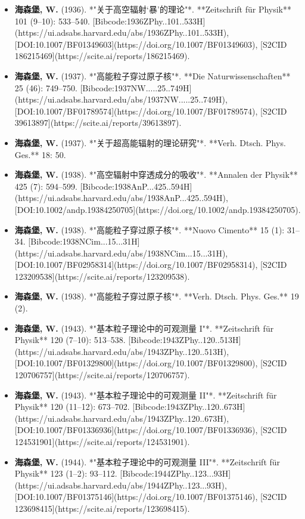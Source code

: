 \begin{itemize}
\item \textbf{海森堡, W.} (1936). *"关于高空辐射‘暴’的理论"*. **Zeitschrift für Physik** 101 (9–10): 533–540. [Bibcode:1936ZPhy..101..533H](https://ui.adsabs.harvard.edu/abs/1936ZPhy..101..533H), [DOI:10.1007/BF01349603](https://doi.org/10.1007/BF01349603), [S2CID 186215469](https://scite.ai/reports/186215469).  
\item \textbf{海森堡, W.} (1937). *"高能粒子穿过原子核"*. **Die Naturwissenschaften** 25 (46): 749–750. [Bibcode:1937NW.....25..749H](https://ui.adsabs.harvard.edu/abs/1937NW.....25..749H), [DOI:10.1007/BF01789574](https://doi.org/10.1007/BF01789574), [S2CID 39613897](https://scite.ai/reports/39613897).  
\item \textbf{海森堡, W.} (1937). *"关于超高能辐射的理论研究"*. **Verh. Dtsch. Phys. Ges.** 18: 50.  
\item \textbf{海森堡, W.} (1938). *"高空辐射中穿透成分的吸收"*. **Annalen der Physik** 425 (7): 594–599. [Bibcode:1938AnP...425..594H](https://ui.adsabs.harvard.edu/abs/1938AnP...425..594H), [DOI:10.1002/andp.19384250705](https://doi.org/10.1002/andp.19384250705).  
\item \textbf{海森堡, W.} (1938). *"高能粒子穿过原子核"*. **Nuovo Cimento** 15 (1): 31–34. [Bibcode:1938NCim...15...31H](https://ui.adsabs.harvard.edu/abs/1938NCim...15...31H), [DOI:10.1007/BF02958314](https://doi.org/10.1007/BF02958314), [S2CID 123209538](https://scite.ai/reports/123209538).  
\item \textbf{海森堡, W.} (1938). *"高能粒子穿过原子核"*. **Verh. Dtsch. Phys. Ges.** 19 (2).  
\item \textbf{海森堡, W.} (1943). *"基本粒子理论中的可观测量 I"*. **Zeitschrift für Physik** 120 (7–10): 513–538. [Bibcode:1943ZPhy..120..513H](https://ui.adsabs.harvard.edu/abs/1943ZPhy..120..513H), [DOI:10.1007/BF01329800](https://doi.org/10.1007/BF01329800), [S2CID 120706757](https://scite.ai/reports/120706757).  
\item \textbf{海森堡, W.} (1943). *"基本粒子理论中的可观测量 II"*. **Zeitschrift für Physik** 120 (11–12): 673–702. [Bibcode:1943ZPhy..120..673H](https://ui.adsabs.harvard.edu/abs/1943ZPhy..120..673H), [DOI:10.1007/BF01336936](https://doi.org/10.1007/BF01336936), [S2CID 124531901](https://scite.ai/reports/124531901).  
\item \textbf{海森堡, W.} (1944). *"基本粒子理论中的可观测量 III"*. **Zeitschrift für Physik** 123 (1–2): 93–112. [Bibcode:1944ZPhy..123...93H](https://ui.adsabs.harvard.edu/abs/1944ZPhy..123...93H), [DOI:10.1007/BF01375146](https://doi.org/10.1007/BF01375146), [S2CID 123698415](https://scite.ai/reports/123698415).  

\end{itemize}
